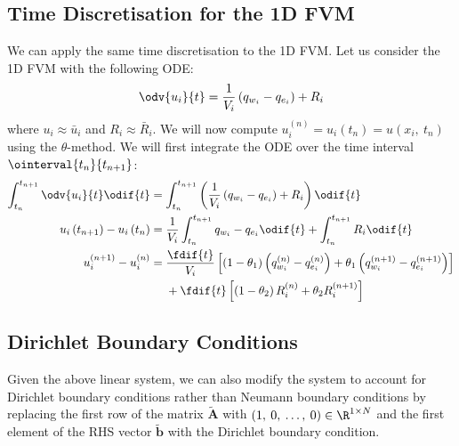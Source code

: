 \documentclass{article}
\begin{document}
\subsection{Time Discretisation for the 1D FVM}
We can apply the same time discretisation to the 1D FVM. Let us
consider the 1D FVM with the following ODE:
\begin{equation*}
    \odv{u_i}{t} = \frac{1}{V_i} \left( q_{w_i} - q_{e_i} \right) + R_i
\end{equation*}
where \(u_i \approx \bar{u}_i\) and \(R_i \approx \bar{R}_i\). We will
now compute \(u_i^{\left( n \right)} = u_i\left( t_n \right) = u\left( x_i,\: t_n \right)\)
using the \(\theta\)-method. We will first integrate the ODE over the
time interval \(\ointerval{t_n}{t_{n+1}}\):
\begin{align*}
    \int_{t_n}^{t_{n+1}} \odv{u_i}{t} \odif{t}        & = \int_{t_n}^{t_{n+1}} \left( \frac{1}{V_i} \left( q_{w_i} - q_{e_i} \right) + R_i \right) \odif{t}                                                                                                                                                                                                              \\
    u_i\left( t_{n+1} \right) - u_i\left( t_n \right) & = \frac{1}{V_i} \int_{t_n}^{t_{n+1}} q_{w_i} - q_{e_i} \odif{t} + \int_{t_n}^{t_{n+1}} R_i \odif{t}                                                                                                                                                                                                              \\
    u_i^{\left( n+1 \right)} - u_i^{\left( n \right)} & = \begin{aligned}[t]
        &{}\frac{\fdif{t}}{V_i} \left[ \left( 1 - \theta_1 \right) \left( q_{w_i}^{\left( n \right)} - q_{e_i}^{\left( n \right)} \right) + \theta_1 \left( q_{w_i}^{\left( n+1 \right)} - q_{e_i}^{\left( n+1 \right)} \right) \right] \\
        &{}+ \fdif{t} \left[ \left( 1 - \theta_2 \right) R_i^{\left( n \right)} + \theta_2 R_i^{\left( n+1 \right)} \right]
    \end{aligned}
\end{align*}
\subsection{Dirichlet Boundary Conditions}
Given the above linear system, we can also modify the system to account
for Dirichlet boundary conditions rather than Neumann boundary conditions
by replacing the first row of the matrix \(\tilde{\symbf{A}}\) with
\({\left( 1,\: 0,\: \dots,\: 0 \right)} \in \R^{1 \times N}\) and
the first element of the RHS vector \(\tilde{\symbf{b}}\) with the Dirichlet
boundary condition.
\end{document}
